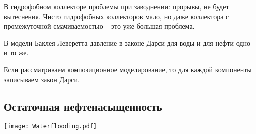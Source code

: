 \documentclass[main.tex]{subfiles}
\begin{document}
В гидрофобном коллекторе проблемы при заводнении: прорывы, не будет вытеснения. Чисто гидрофобных коллекторов мало, но даже коллектора с промежуточной смачиваемостью -- это уже большая проблема.



В модели Баклея-Леверетта давление в законе Дарси для воды и для нефти одно и то же.

Если рассматриваем композиционное моделирование, то для каждой компоненты записываем закон Дарси.




\subsection{Остаточная нефтенасыщенность}

\texttt{[image: Waterflooding.pdf]}






\end{document}
